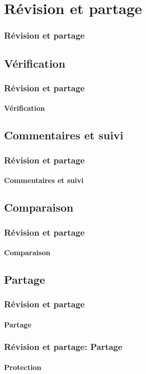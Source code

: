 \documentclass[xcolor=table]{beamer}
\begin{document}
\section{Révision et partage}

\begin{frame}
\frametitle{Révision et partage}

\end{frame}

\subsection{Vérification}

\begin{frame}
\frametitle{Révision et partage}
\framesubtitle{Vérification}

\end{frame}

\subsection{Commentaires et suivi}

\begin{frame}
\frametitle{Révision et partage}
\framesubtitle{Commentaires et suivi}

\end{frame}

\subsection{Comparaison}

\begin{frame}
\frametitle{Révision et partage}
\framesubtitle{Comparaison}

\end{frame}

\subsection{Partage}

\begin{frame}
\frametitle{Révision et partage}
\framesubtitle{Partage}


\end{frame}

\begin{frame}
\frametitle{Révision et partage: Partage}
\framesubtitle{Protection}

\end{frame}
\end{document}
